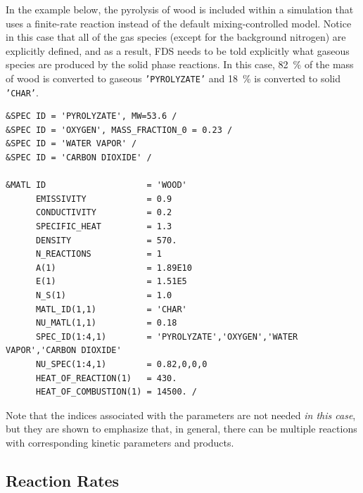 \documentclass[11pt]{book}
\newcommand{\ct}{\tt\small}
\begin{document}
In the example below, the pyrolysis of wood is included within a simulation that uses
a finite-rate reaction instead of the default mixing-controlled model. Notice in this case that
all of the gas species (except for the background nitrogen) are explicitly defined, and as a result, FDS
needs to be told explicitly what gaseous species are produced by the solid phase reactions. In this case, 82~\% of the
mass of wood is converted to gaseous {\ct 'PYROLYZATE'} and 18~\% is converted to solid {\ct 'CHAR'}.

\footnotesize
\begin{verbatim}
&SPEC ID = 'PYROLYZATE', MW=53.6 /
&SPEC ID = 'OXYGEN', MASS_FRACTION_0 = 0.23 /
&SPEC ID = 'WATER VAPOR' /
&SPEC ID = 'CARBON DIOXIDE' /

&MATL ID                    = 'WOOD'
      EMISSIVITY            = 0.9
      CONDUCTIVITY          = 0.2
      SPECIFIC_HEAT         = 1.3
      DENSITY               = 570.
      N_REACTIONS           = 1
      A(1)                  = 1.89E10
      E(1)                  = 1.51E5
      N_S(1)                = 1.0
      MATL_ID(1,1)          = 'CHAR'
      NU_MATL(1,1)          = 0.18
      SPEC_ID(1:4,1)        = 'PYROLYZATE','OXYGEN','WATER VAPOR','CARBON DIOXIDE'
      NU_SPEC(1:4,1)        = 0.82,0,0,0
      HEAT_OF_REACTION(1)   = 430.
      HEAT_OF_COMBUSTION(1) = 14500. /
\end{verbatim} \normalsize

\noindent Note that the indices associated with the parameters are not needed {\em in this case}, but they are shown to emphasize that, in general, there can
be multiple reactions with corresponding kinetic parameters and products.

\subsection{Reaction Rates}
\end{document}
